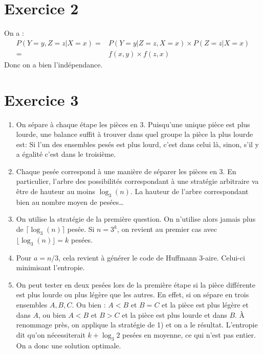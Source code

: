 \documentclass{cours}
\begin{document}
\section{Exercice 2}
On a : 
\[
	\begin{aligned}
		P(Y = y, Z = z | X = x) =& P(Y = y | Z = z, X = x)\times P(Z = z | X = x)\\
		=& f(x, y)\times f(z, x)
	\end{aligned}
\]
Donc on a bien l'indépendance. 
\section{Exercice 3}
\begin{enumerate}
	\item On sépare à chaque étape les pièces en 3. Puisqu'une unique pièce est plus lourde, une balance suffit à trouver dans quel groupe la pièce la plus lourde est: Si l'un des ensembles pesés est plus lourd, c'est dans celui là, sinon, s'il y a égalité c'est dans le troisième. 
	\item Chaque pesée correspond à une manière de séparer les pièces en $3$. En particulier, l'arbre des possibilités correspondant à une stratégie arbitraire va être de hauteur au moins $\log_{3}(n)$. 
		La hauteur de l'arbre correspondant bien au nombre moyen de pesées\ldots
	\item On utilise la stratégie de la première question. On n'utilise alors jamais plus de $\lceil\log_{3}(n)\rceil$ pesée. Si $n = 3^{k}$, on revient au premier cas avec $\lfloor \log_{3}(n) \rfloor = k$ pesées.
	\item Pour $a = n/3$, cela revient à générer le code de Huffmann $3$-aire. Celui-ci minimisant l'entropie. 
	\item On peut tester en deux pesées lors de la première étape si la pièce différente est plus lourde ou plus légère que les autres. En effet, si on sépare en trois ensembles $A, B, C$. Ou bien : $A < B$ et $B = C$ et la pièce est plus légère et dans $A$, ou bien $A < B$ et $B > C$ et la pièce est plus lourde et dans $B$. À renommage près, on applique la stratégie de 1) et on a le résultat. 
	L'entropie dit qu'on nécessiterait $k + \log_{3} 2$ pesées en moyenne, ce qui n'est pas entier. On a donc une solution optimale. 
\end{enumerate}
\end{document}
